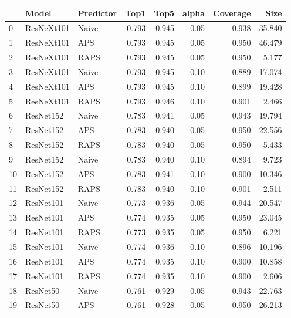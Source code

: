 \begin{tabular}{lllrrrrr}
\toprule
{} &        Model & Predictor &   Top1 &   Top5 &  alpha &  Coverage &     Size \\
\midrule
0  &   ResNeXt101 &     Naive &  0.793 &  0.945 &   0.05 &     0.938 &   35.840 \\
1  &   ResNeXt101 &       APS &  0.793 &  0.945 &   0.05 &     0.950 &   46.479 \\
2  &   ResNeXt101 &      RAPS &  0.793 &  0.945 &   0.05 &     0.950 &    5.177 \\
3  &   ResNeXt101 &     Naive &  0.793 &  0.945 &   0.10 &     0.889 &   17.074 \\
4  &   ResNeXt101 &       APS &  0.793 &  0.945 &   0.10 &     0.899 &   19.428 \\
5  &   ResNeXt101 &      RAPS &  0.793 &  0.946 &   0.10 &     0.901 &    2.466 \\
6  &    ResNet152 &     Naive &  0.783 &  0.941 &   0.05 &     0.943 &   19.794 \\
7  &    ResNet152 &       APS &  0.783 &  0.940 &   0.05 &     0.950 &   22.556 \\
8  &    ResNet152 &      RAPS &  0.783 &  0.940 &   0.05 &     0.950 &    5.433 \\
9  &    ResNet152 &     Naive &  0.783 &  0.940 &   0.10 &     0.894 &    9.723 \\
10 &    ResNet152 &       APS &  0.783 &  0.941 &   0.10 &     0.900 &   10.346 \\
11 &    ResNet152 &      RAPS &  0.783 &  0.940 &   0.10 &     0.901 &    2.511 \\
12 &    ResNet101 &     Naive &  0.773 &  0.936 &   0.05 &     0.944 &   20.547 \\
13 &    ResNet101 &       APS &  0.774 &  0.935 &   0.05 &     0.950 &   23.045 \\
14 &    ResNet101 &      RAPS &  0.773 &  0.935 &   0.05 &     0.950 &    6.221 \\
15 &    ResNet101 &     Naive &  0.774 &  0.936 &   0.10 &     0.896 &   10.196 \\
16 &    ResNet101 &       APS &  0.774 &  0.935 &   0.10 &     0.900 &   10.858 \\
17 &    ResNet101 &      RAPS &  0.774 &  0.935 &   0.10 &     0.900 &    2.606 \\
18 &     ResNet50 &     Naive &  0.761 &  0.929 &   0.05 &     0.943 &   22.763 \\
19 &     ResNet50 &       APS &  0.761 &  0.928 &   0.05 &     0.950 &   26.213 \\

\end{tabular}
